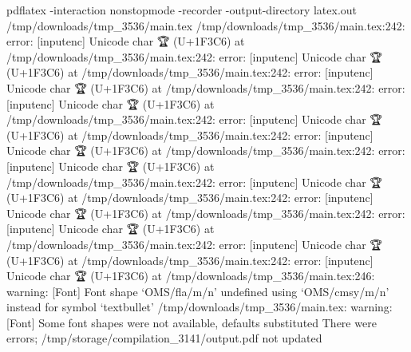 pdflatex -interaction nonstopmode -recorder -output-directory latex.out /tmp/downloads/tmp_3536/main.tex
/tmp/downloads/tmp_3536/main.tex:242: error: [inputenc] Unicode char 🏆 (U+1F3C6)
      at 
/tmp/downloads/tmp_3536/main.tex:242: error: [inputenc] Unicode char 🏆 (U+1F3C6)
      at 
/tmp/downloads/tmp_3536/main.tex:242: error: [inputenc] Unicode char 🏆 (U+1F3C6)
      at 
/tmp/downloads/tmp_3536/main.tex:242: error: [inputenc] Unicode char 🏆 (U+1F3C6)
      at 
/tmp/downloads/tmp_3536/main.tex:242: error: [inputenc] Unicode char 🏆 (U+1F3C6)
      at 
/tmp/downloads/tmp_3536/main.tex:242: error: [inputenc] Unicode char 🏆 (U+1F3C6)
      at 
/tmp/downloads/tmp_3536/main.tex:242: error: [inputenc] Unicode char 🏆 (U+1F3C6)
      at 
/tmp/downloads/tmp_3536/main.tex:242: error: [inputenc] Unicode char 🏆 (U+1F3C6)
      at 
/tmp/downloads/tmp_3536/main.tex:242: error: [inputenc] Unicode char 🏆 (U+1F3C6)
      at 
/tmp/downloads/tmp_3536/main.tex:242: error: [inputenc] Unicode char 🏆 (U+1F3C6)
      at 
/tmp/downloads/tmp_3536/main.tex:242: error: [inputenc] Unicode char 🏆 (U+1F3C6)
      at 
/tmp/downloads/tmp_3536/main.tex:242: error: [inputenc] Unicode char 🏆 (U+1F3C6)
      at 
/tmp/downloads/tmp_3536/main.tex:246: warning: [Font] Font shape `OMS/fla/m/n' undefined using `OMS/cmsy/m/n' instead for symbol `textbullet'
/tmp/downloads/tmp_3536/main.tex: warning: [Font] Some font shapes were not available, defaults substituted
There were errors; /tmp/storage/compilation_3141/output.pdf not updated
